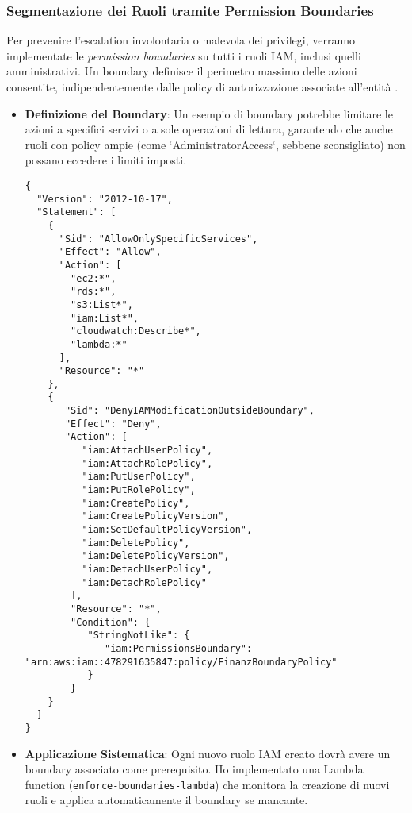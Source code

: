\subsubsection{Segmentazione dei Ruoli tramite Permission Boundaries}

Per prevenire l'escalation involontaria o malevola dei privilegi, verranno implementate le \emph{permission boundaries} su tutti i ruoli IAM, inclusi quelli amministrativi. Un boundary definisce il perimetro massimo delle azioni consentite, indipendentemente dalle policy di autorizzazione associate all'entità \cite{aws:iam:boundaries}.
\begin{itemize}
    \item \textbf{Definizione del Boundary}: Un esempio di boundary potrebbe limitare le azioni a specifici servizi o a sole operazioni di lettura, garantendo che anche ruoli con policy ampie (come `AdministratorAccess`, sebbene sconsigliato) non possano eccedere i limiti imposti.
    \begin{lstlisting}[style=json, caption={Esempio di Permission Boundary restrittiva}, label=lst:permission-boundary]
{
  "Version": "2012-10-17",
  "Statement": [
    {
      "Sid": "AllowOnlySpecificServices",
      "Effect": "Allow",
      "Action": [
        "ec2:*",
        "rds:*",
        "s3:List*",
        "iam:List*",
        "cloudwatch:Describe*",
        "lambda:*"
      ],
      "Resource": "*"
    },
    {
       "Sid": "DenyIAMModificationOutsideBoundary",
       "Effect": "Deny",
       "Action": [
          "iam:AttachUserPolicy",
          "iam:AttachRolePolicy",
          "iam:PutUserPolicy",
          "iam:PutRolePolicy",
          "iam:CreatePolicy",
          "iam:CreatePolicyVersion",
          "iam:SetDefaultPolicyVersion",
          "iam:DeletePolicy",
          "iam:DeletePolicyVersion",
          "iam:DetachUserPolicy",
          "iam:DetachRolePolicy"
        ],
        "Resource": "*",
        "Condition": {
           "StringNotLike": {
              "iam:PermissionsBoundary": "arn:aws:iam::478291635847:policy/FinanzBoundaryPolicy"
           }
        }
    }
  ]
}
    \end{lstlisting}
    \item \textbf{Applicazione Sistematica}: Ogni nuovo ruolo IAM creato dovrà avere un boundary associato come prerequisito. Ho implementato una Lambda function (\texttt{enforce-boundaries-lambda}) che monitora la creazione di nuovi ruoli e applica automaticamente il boundary se mancante.
\end{itemize}

